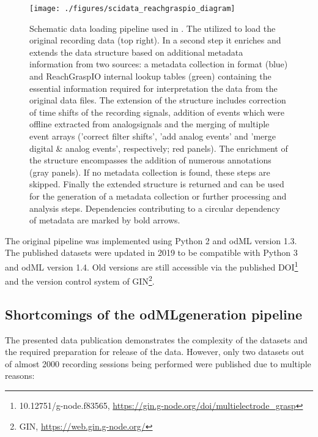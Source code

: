 \begin{figure}
 \texttt{[image: ./figures/scidata\_reachgraspio\_diagram]}
 \caption[Schematic data loading pipeline used in \citet{Brochier_2018}]{Schematic data loading pipeline used in \citet{Brochier_2018}. The  utilized  to load the original recording data (top right). In a second step it enriches and extends the data structure based on additional metadata information from two sources: a metadata collection in  format (blue) and ReachGraspIO internal lookup tables (green) containing the essential information required for interpretation the data from the original data files. The extension of the  structure includes correction of time shifts of the recording signals, addition of events which were offline extracted from analogsignals and the merging of multiple event arrays ('correct filter shifts', 'add analog events' and 'merge digital \& analog events', respectively; red panels). The enrichment of the  structure encompasses the addition of numerous annotations (gray panels). If no metadata collection is found, these steps are skipped. Finally the extended  structure is returned and can be used for the generation of a metadata collection or further processing and analysis steps. Dependencies contributing to a circular dependency of metadata are marked by bold arrows.}
 \label{fig:scidata_reachgraspio_diagram}
\end{figure}




The original pipeline was implemented using Python 2 and odML version 1.3. The published datasets were updated in 2019 to be compatible with Python 3 and odML version 1.4. Old versions are still accessible via the published DOI\footnote{10.12751/g-node.f83565, \url{https://gin.g-node.org/doi/multielectrode_grasp}} and the version control system of GIN\footnote{GIN, \url{https://web.gin.g-node.org/}}.

\subsection{Shortcomings of the odMLgeneration pipeline}
\label{sec:scidata_shortcomings}
The presented data publication demonstrates the complexity of the datasets and the required preparation for release of the data. However, only two datasets out of almost 2000 recording sessions being performed were published due to multiple reasons:


